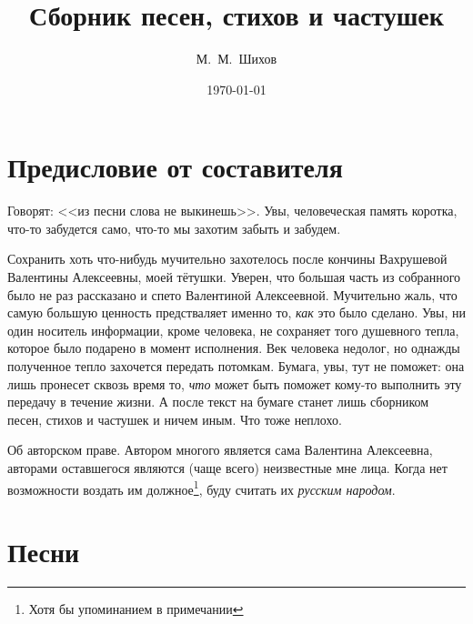\documentclass[a4paper,oneside,14pt]{scrbook}
\title{Сборник песен, стихов и частушек}
\author{М.~М.~Шихов}
\date{\today}
\begin{document}
    \maketitle
    \tableofcontents
    \renewcommand{\poemtoc}{subsection}
    \newcommand{\attrib}[1]{\nopagebreak{\raggedleft\footnotesize #1\par}}

    \chapter*{Предисловие от составителя}
    
    Говорят: <<из песни слова не выкинешь>>. Увы, человеческая память коротка, что-то забудется само, что-то мы захотим забыть и забудем. 
    
    Сохранить хоть что-нибудь мучительно захотелось после кончины Вахрушевой Валентины Алексеевны, моей тётушки. Уверен, что большая часть из собранного было не раз рассказано и спето Валентиной Алексеевной. Мучительно жаль, что самую большую ценность предстваляет именно то, \emph{как} это было сделано. Увы, ни один носитель информации, кроме человека, не сохраняет того душевного тепла, которое было подарено в момент исполнения. Век человека недолог, но однажды полученное тепло захочется передать потомкам. Бумага, увы, тут не поможет: она лишь пронесет сквозь время то, \emph{что} может быть поможет кому-то выполнить эту передачу в течение жизни. А после текст на бумаге станет лишь сборником песен, стихов и частушек и ничем иным. Что тоже неплохо.
    
    Об авторском праве. Автором многого является сама Валентина Алексеевна, авторами оставшегося являются (чаще всего) неизвестные мне лица. Когда нет возможности воздать им должное\footnote{Хотя бы упоминанием в примечании}, буду считать их \emph{русским народом}. 
    
    \chapter{Песни}
    
\end{document}
